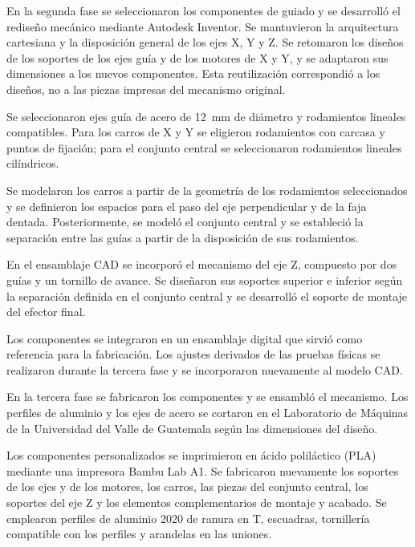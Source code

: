 
En la segunda fase se seleccionaron los componentes de guiado y se desarrolló el rediseño mecánico mediante Autodesk Inventor. Se mantuvieron la arquitectura cartesiana y la disposición general de los ejes X, Y y Z. Se retomaron los diseños de los soportes de los ejes guía y de los motores de X y Y, y se adaptaron sus dimensiones a los nuevos componentes. Esta reutilización correspondió a los diseños, no a las piezas impresas del mecanismo original.

Se seleccionaron ejes guía de acero de 12~mm de diámetro y rodamientos lineales compatibles. Para los carros de X y Y se eligieron rodamientos con carcasa y puntos de fijación; para el conjunto central se seleccionaron rodamientos lineales cilíndricos.

Se modelaron los carros a partir de la geometría de los rodamientos seleccionados y se definieron los espacios para el paso del eje perpendicular y de la faja dentada. Posteriormente, se modeló el conjunto central y se estableció la separación entre las guías a partir de la disposición de sus rodamientos.

En el ensamblaje CAD se incorporó el mecanismo del eje Z, compuesto por dos guías y un tornillo de avance. Se diseñaron sus soportes superior e inferior según la separación definida en el conjunto central y se desarrolló el soporte de montaje del efector final.

Los componentes se integraron en un ensamblaje digital que sirvió como referencia para la fabricación. Los ajustes derivados de las pruebas físicas se realizaron durante la tercera fase y se incorporaron nuevamente al modelo CAD.



En la tercera fase se fabricaron los componentes y se ensambló el mecanismo. Los perfiles de aluminio y los ejes de acero se cortaron en el Laboratorio de Máquinas de la Universidad del Valle de Guatemala según las dimensiones del diseño.

Los componentes personalizados se imprimieron en ácido poliláctico (PLA) mediante una impresora Bambu Lab A1. Se fabricaron nuevamente los soportes de los ejes y de los motores, los carros, las piezas del conjunto central, los soportes del eje Z y los elementos complementarios de montaje y acabado. Se emplearon perfiles de aluminio 2020 de ranura en T, escuadras, tornillería compatible con los perfiles y arandelas en las uniones.

